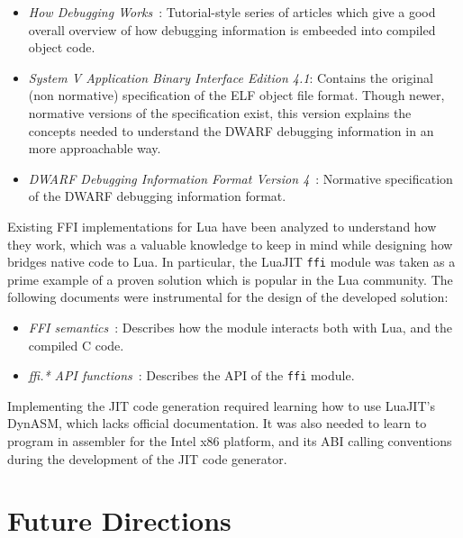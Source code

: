 \begin{itemize}

	\item \emph{How Debugging Works}~\cite{howdebugworks}: Tutorial-style
	series of articles which give a good overall overview of how debugging
	information is embeeded into compiled object code.

	\item \emph{System V Application Binary Interface Edition
	4.1}\cite{elfspec-sysv}: Contains the original (non normative)
	  specification of the ELF object file format. Though newer, normative
	  versions of the specification exist, this version explains the concepts
	  needed to understand the DWARF debugging information in an more
	  approachable way.

	\item \emph{DWARF Debugging Information Format Version
	4}~\cite{dwarfspecv4}: Normative specification of the DWARF debugging
	  information format.

\end{itemize}

Existing FFI implementations for Lua have been analyzed to understand how they
work, which was a valuable knowledge to keep in mind while designing how \Eol*
bridges native code to Lua. In particular, the LuaJIT \verb|ffi| module was
taken as a prime example of a proven solution which is popular in the Lua
community. The following documents were instrumental for the design of the
developed solution:

\begin{itemize}

	\item \emph{FFI semantics}~\cite{lj-ffi-semantic}: Describes how the
	module interacts both with Lua, and the compiled C code.

	\item \emph{ffi.* API functions}~\cite{lj-ffi-api}: Describes the API
	of the \verb|ffi| module.

\end{itemize}

Implementing the JIT code generation required learning how to use LuaJIT's
DynASM, which lacks official documentation. It was also needed to learn to
program in assembler for the Intel x86 platform, and its \gls{ABI} calling
conventions during the development of the JIT code generator.


\section{Future Directions}

